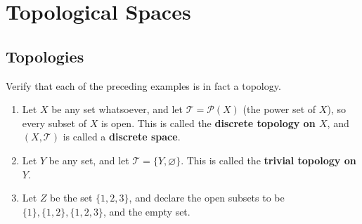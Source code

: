 \chapter{Topological Spaces}

\section*{Topologies}

\begin{exercise}{2.2}
	Verify that each of the preceding examples is in fact a topology.

	\begin{enumerate}[label={(\alph*)}]
		\item Let $X$ be any set whatsoever, and let $\mathscr{T} = \mathscr{P}(X)$ (the power set of $X$), so every subset of $X$ is open. This is called the \textbf{discrete topology on $X$}, and $(X, \mathscr{T})$ is called a \textbf{discrete space}.
		\item Let $Y$ be any set, and let $\mathscr{T} = \{Y, \varnothing \}$. This is called the \textbf{trivial topology on $Y$}.
		\item Let $Z$ be the set $\{1,2,3\}$, and declare the open subsets to be $\{1\}, \{1,2\}, \{1,2,3\}$, and the empty set.
	\end{enumerate}
\end{exercise}

